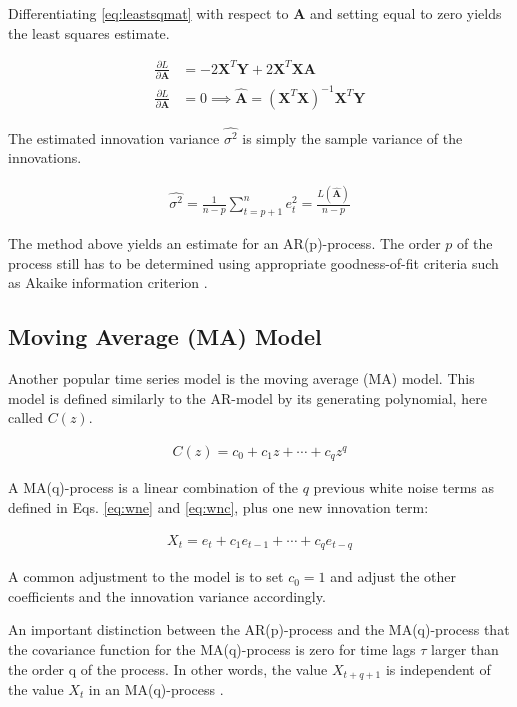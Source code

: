 Differentiating \ref{eq:leastsqmat} with respect to $\mathbf{A}$ and setting equal to zero yields the least squares estimate. 

\begin{align}
    \frac{\partial L}{\partial \mathbf{A}} &= -2 \mathbf{X}^T \mathbf{Y} + 2\mathbf{X}^T \mathbf{X} \mathbf{A} \\
    \frac{\partial L}{\partial \mathbf{A}} &= 0 \implies \hat{\mathbf{A}} = (\mathbf{X}^T \mathbf{X})^{-1} \mathbf{X}^T \mathbf{Y}
 \end{align}

The estimated innovation variance $\hat{\sigma^2}$ is simply the sample variance of the innovations.

\begin{align}
    \hat{\sigma^2} =\frac{1}{n-p} \sum_{t=p+1}^n e_t^2 = \frac{L(\hat{\mathbf{A}})}{n-p}
\end{align}

The method above yields an estimate for an AR(p)-process. The order $p$ of the process still has to be determined using appropriate goodness-of-fit criteria such as Akaike information criterion \citep{lindgren2014stationary}. 



\subsection{Moving Average (MA) Model}

Another popular time series model is the moving average (MA) model. This model is defined similarly to the AR-model by its generating polynomial, here called $C(z)$. 

\begin{align}
    C(z) = c_0 + c_1 z + \cdots + c_q z^q 
\end{align}

A MA(q)-process is a linear combination of the $q$ previous white noise terms as defined in Eqs. \ref{eq:wne} and \ref{eq:wnc}, plus one new innovation term:

\begin{align}
    X_t = e_t + c_1 e_{t-1} + \cdots + c_q e_{t-q}
\end{align}

A common adjustment to the model is to set $c_0 = 1$ and adjust the other coefficients and the innovation variance accordingly. 

An important distinction between the AR(p)-process and the MA(q)-process that the covariance function for the MA(q)-process is zero for time lags $\tau$ larger than the order q of the process. In other words, the value $X_{t+q + 1}$ is independent of the value $X_t$ in an MA(q)-process \citep{lindgren2014stationary}. 

